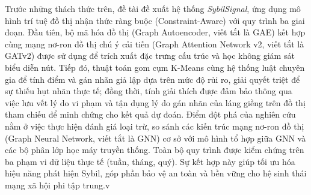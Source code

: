 Trước những thách thức trên, đề tài đề xuất hệ thống \textit{SybilSignal}, ứng dụng mô hình trí tuệ đồ thị nhận thức ràng buộc (Constraint-Aware) với quy trình ba giai đoạn. Đầu tiên, bộ mã hóa đồ thị (Graph Autoencoder, viết tắt là GAE) \cite{kipf2016variational} kết hợp cùng mạng nơ-ron đồ thị chú ý cải tiến (Graph Attention Network v2, viết tắt là GATv2) \cite{brody2021attentive} được sử dụng để trích xuất đặc trưng cấu trúc và học không giám sát biểu diễn nút. Tiếp đó, thuật toán gom cụm K-Means cùng hệ thống luật chuyên gia để tính điểm và gán nhãn giả lập dựa trên mức độ rủi ro, giải quyết triệt để sự thiếu hụt nhãn thực tế; đồng thời, tính giải thích được đảm bảo thông qua việc lưu vết lý do vi phạm và tận dụng lý do gán nhãn của láng giềng trên đồ thị tham chiếu để minh chứng cho kết quả dự đoán. Điểm đột phá của nghiên cứu nằm ở việc thực hiện đánh giá loại trừ, so sánh các kiến trúc mạng nơ-ron đồ thị (Graph Neural Network, viết tắt là GNN) \cite{ivanov2021boosted} cơ sở với mô hình tổ hợp giữa GNN và các bộ phân lớp học máy truyền thống. Toàn bộ quy trình được kiểm chứng trên ba phạm vi dữ liệu thực tế (tuần, tháng, quý). Sự kết hợp này giúp tối ưu hóa hiệu năng phát hiện Sybil, góp phần bảo vệ an toàn và bền vững cho hệ sinh thái mạng xã hội phi tập trung.v 